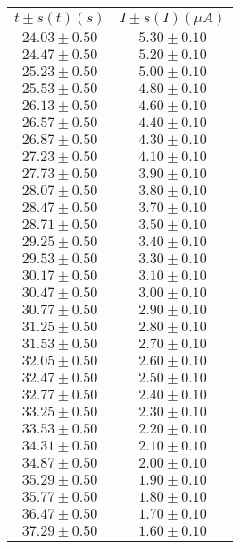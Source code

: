 \begin{table}[H]
\centering
\setlength{\arrayrulewidth}{1.2pt}
\begin{tabular}{|c|c|}
\hline
$t \pm s(t) (s)$ & $I \pm s(I) (\mu A)$ \\
\hline
$24.03 \pm 0.50$ & $5.30 \pm 0.10$ \\
$24.47 \pm 0.50$ & $5.20 \pm 0.10$ \\
$25.23 \pm 0.50$ & $5.00 \pm 0.10$ \\
$25.53 \pm 0.50$ & $4.80 \pm 0.10$ \\
$26.13 \pm 0.50$ & $4.60 \pm 0.10$ \\
$26.57 \pm 0.50$ & $4.40 \pm 0.10$ \\
$26.87 \pm 0.50$ & $4.30 \pm 0.10$ \\
$27.23 \pm 0.50$ & $4.10 \pm 0.10$ \\
$27.73 \pm 0.50$ & $3.90 \pm 0.10$ \\
$28.07 \pm 0.50$ & $3.80 \pm 0.10$ \\
$28.47 \pm 0.50$ & $3.70 \pm 0.10$ \\
$28.71 \pm 0.50$ & $3.50 \pm 0.10$ \\
$29.25 \pm 0.50$ & $3.40 \pm 0.10$ \\
$29.53 \pm 0.50$ & $3.30 \pm 0.10$ \\
$30.17 \pm 0.50$ & $3.10 \pm 0.10$ \\
$30.47 \pm 0.50$ & $3.00 \pm 0.10$ \\
$30.77 \pm 0.50$ & $2.90 \pm 0.10$ \\
$31.25 \pm 0.50$ & $2.80 \pm 0.10$ \\
$31.53 \pm 0.50$ & $2.70 \pm 0.10$ \\
$32.05 \pm 0.50$ & $2.60 \pm 0.10$ \\
$32.47 \pm 0.50$ & $2.50 \pm 0.10$ \\
$32.77 \pm 0.50$ & $2.40 \pm 0.10$ \\
$33.25 \pm 0.50$ & $2.30 \pm 0.10$ \\
$33.53 \pm 0.50$ & $2.20 \pm 0.10$ \\
$34.31 \pm 0.50$ & $2.10 \pm 0.10$ \\
$34.87 \pm 0.50$ & $2.00 \pm 0.10$ \\
$35.29 \pm 0.50$ & $1.90 \pm 0.10$ \\
$35.77 \pm 0.50$ & $1.80 \pm 0.10$ \\
$36.47 \pm 0.50$ & $1.70 \pm 0.10$ \\
$37.29 \pm 0.50$ & $1.60 \pm 0.10$ \\

\end{tabular}
\end{table}
